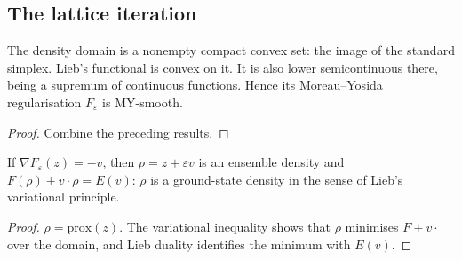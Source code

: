 \subsection{The lattice iteration}

\begin{lemma}
  \label{lem:liebE}
  \leanok
  The density domain is a nonempty compact convex set: the image of the standard simplex. Lieb's functional
  is convex on it. It is also lower semicontinuous there, being a supremum of continuous functions. Hence
  its Moreau--Yosida regularisation $F_\varepsilon$ is MY-smooth.
\end{lemma}
\begin{proof}
  \leanok
  Combine the preceding results.
\end{proof}

\begin{theorem}
  \label{thm:density_of_quasi}
  \leanok
  If $\nabla F_\varepsilon(z)=-v$, then $\rho=z+\varepsilon v$ is an ensemble density and
  $F(\rho)+v\cdot\rho=E(v)$: $\rho$ is a ground-state density in the sense of Lieb's variational
  principle.
\end{theorem}
\begin{proof}
  \leanok
  $\rho=\mathrm{prox}(z)$. The variational inequality shows that $\rho$ minimises $F+v\cdot$ over the domain,
  and Lieb duality identifies the minimum with $E(v)$.
\end{proof}

